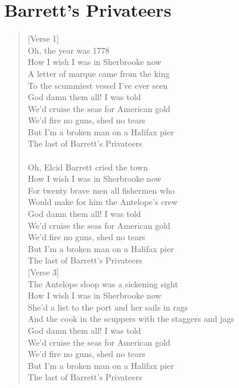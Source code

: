 \documentclass[11pt]{article}
\begin{document}
\section{Barrett's Privateers}
\label{sec:org03d97a4}
\begin{verse}
[Verse 1]\\
Oh, the year was 1778\\
How I wish I was in Sherbrooke now\\
A letter of marque came from the king\\
To the scummiest vessel I've ever seen\\
God damn them all! I was told\\
We'd cruise the seas for American gold\\
We'd fire no guns, shed no tears\\
But I'm a broken man on a Halifax pier\\
The last of Barrett's Privateers\\
[Verse 2]\\
Oh, Elcid Barrett cried the town\\
How I wish I was in Sherbrooke now\\
For twenty brave men all fishermen who\\
Would make for him the Antelope's crew\\
God damn them all! I was told\\
We'd cruise the seas for American gold\\
We'd fire no guns, shed no tears\\
But I'm a broken man on a Halifax pier\\
The last of Barrett's Privateers\\
\vspace*{1em}
[Verse 3]\\
The Antelope sloop was a sickening sight\\
How I wish I was in Sherbrooke now\\
She'd a list to the port and her sails in rags\\
And the cook in the scuppers with the staggers and jags\\
God damn them all! I was told\\
We'd cruise the seas for American gold\\
We'd fire no guns, shed no tears\\
But I'm a broken man on a Halifax pier\\
The last of Barrett's Privateers\\
\vspace*{1em}

\end{verse}
\end{document}

